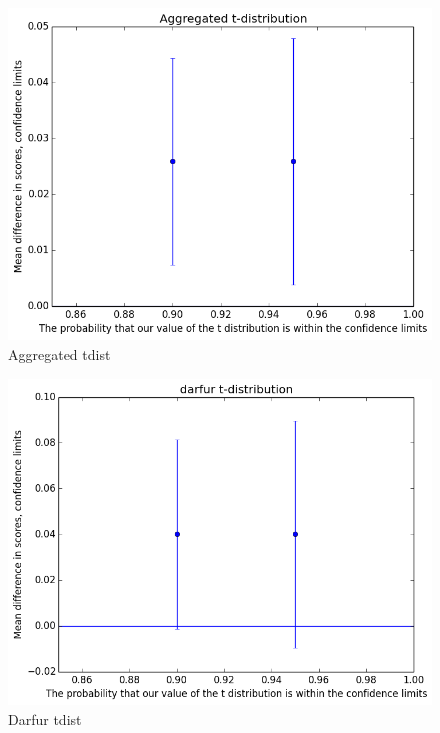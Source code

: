			\begin{figure}[] 
				\centering 
				\includegraphics[width=\textwidth]{aggregated_tdist.png} 
				\caption{Aggregated tdist}
			\end{figure}
			\begin{figure}[] 
				\centering 
				\includegraphics[width=\textwidth]{darfur_tdist.png} 
				\caption{Darfur tdist}
			\end{figure}
